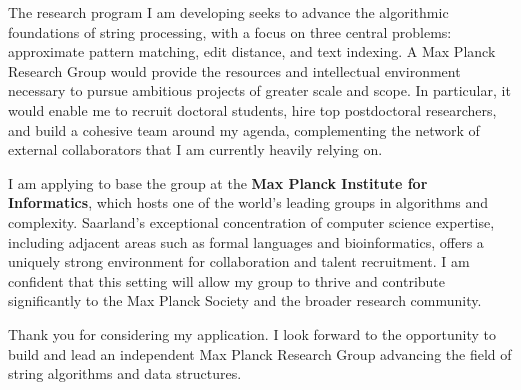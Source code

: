 \documentclass[11pt,a4paper,sans]{moderncv}
\begin{document}
The research program I am developing seeks to advance the algorithmic foundations of string processing, with a focus on three central problems: approximate pattern matching, edit distance, and text indexing. A Max Planck Research Group would provide the resources and intellectual environment necessary to pursue ambitious projects of greater scale and scope. In particular, it would enable me to recruit doctoral students, hire top postdoctoral researchers, and build a cohesive team around my agenda, complementing the network of external collaborators that I am currently heavily relying on.

I am applying to base the group at the \textbf{Max Planck Institute for Informatics}, which hosts one of the world’s leading groups in algorithms and complexity. Saarland's exceptional concentration of computer science expertise, including adjacent areas such as formal languages and bioinformatics, offers a uniquely strong environment for collaboration and talent recruitment. I am confident that this setting will allow my group to thrive and contribute significantly to the Max Planck Society and the broader research community.

Thank you for considering my application. I look forward to the opportunity to build and lead an independent Max Planck Research Group advancing the field of string algorithms and data structures.

\makeletterclosing

\end{document}
